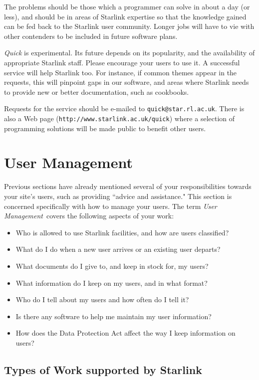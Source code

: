 \documentclass[twoside,11pt]{article}
\begin{document}
The problems should be those which a programmer can solve in about
a day (or less), and should be in areas of Starlink expertise so that the
knowledge gained can be fed back to the Starlink user community.
Longer jobs will have to vie with other contenders to be included in future
software plans.

{\em Quick}\/ is experimental.
Its future depends on its popularity, and the availability of appropriate
Starlink staff.
Please encourage your users to use it.
A successful service will help Starlink too.
For instance, if common themes appear in the requests, this will pinpoint
gaps in our software, and areas where Starlink needs to provide new or better
documentation, such as cookbooks.

Requests for the service should be e-mailed to {\tt quick@star.rl.ac.uk}.
There is also a Web page ({\tt http://www.starlink.ac.uk/quick}) where a
selection of programming solutions will be made public to benefit
other users.

\newpage

\section {\label{usermanagement}User Management}

Previous sections have already mentioned several of your responsibilities
towards your site's users, such as providing ``advice and assistance."
This section is concerned specifically with how to manage your users.
The term {\em User Management}\, covers the following aspects of your work:
\begin{itemize}
\item Who is allowed to use Starlink facilities, and how are users
      classified?
\item What do I do when a new user arrives or an existing user departs?
\item What documents do I give to, and keep in stock for, my users?
\item What information do I keep on my users, and in what format?
\item Who do I tell about my users and how often do I tell it?
\item Is there any software to help me maintain my user information?
\item How does the Data Protection Act affect the way I keep information on
      users?
\end{itemize}

\subsection{\label{worktype}Types of Work supported by Starlink}
\end{document}
